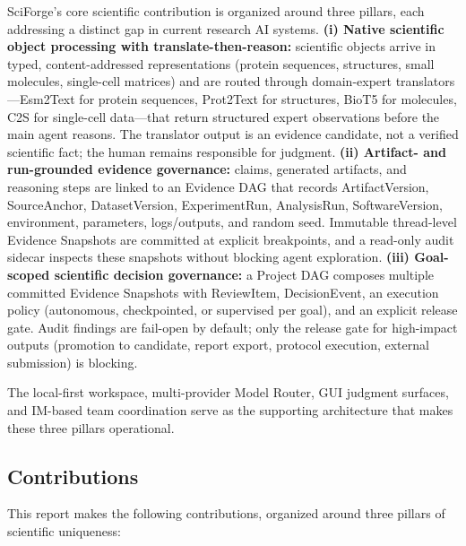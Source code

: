 \documentclass[sn-basic,Numbered,pdflatex]{sn-jnl}
\begin{document}
SciForge's core scientific contribution is organized around three pillars, each addressing a distinct gap in current research AI systems. \textbf{(i) Native scientific object processing with translate-then-reason:} scientific objects arrive in typed, content-addressed representations (protein sequences, structures, small molecules, single-cell matrices) and are routed through domain-expert translators---Esm2Text for protein sequences, Prot2Text for structures, BioT5 for molecules, C2S for single-cell data---that return structured expert observations before the main agent reasons. The translator output is an evidence candidate, not a verified scientific fact; the human remains responsible for judgment. \textbf{(ii) Artifact- and run-grounded evidence governance:} claims, generated artifacts, and reasoning steps are linked to an Evidence DAG that records ArtifactVersion, SourceAnchor, DatasetVersion, ExperimentRun, AnalysisRun, SoftwareVersion, environment, parameters, logs/outputs, and random seed. Immutable thread-level Evidence Snapshots are committed at explicit breakpoints, and a read-only audit sidecar inspects these snapshots without blocking agent exploration. \textbf{(iii) Goal-scoped scientific decision governance:} a Project DAG composes multiple committed Evidence Snapshots with ReviewItem, DecisionEvent, an execution policy (autonomous, checkpointed, or supervised per goal), and an explicit release gate. Audit findings are fail-open by default; only the release gate for high-impact outputs (promotion to candidate, report export, protocol execution, external submission) is blocking.

The local-first workspace, multi-provider Model Router, GUI judgment surfaces, and IM-based team coordination serve as the supporting architecture that makes these three pillars operational.

\subsection{Contributions}

This report makes the following contributions, organized around three pillars of scientific uniqueness:
\end{document}

